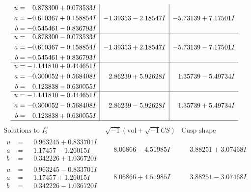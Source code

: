\documentclass[1p]{elsarticle_modified}
\theoremstyle{definition}
\newcommand{\I}{\sqrt{-1}}
\begin{document}
$$\begin{array}{c|c|c}
\begin{aligned}
u &= \phantom{-}0.878300 + 0.073533 I \\
a &= -0.610367 + 0.158854 I \\
b &= -0.545461 - 0.836793 I\end{aligned}
 & -1.39353 - 2.18547 I & -5.73139 + 7.17501 I \\ \hline\begin{aligned}
u &= \phantom{-}0.878300 - 0.073533 I \\
a &= -0.610367 - 0.158854 I \\
b &= -0.545461 + 0.836793 I\end{aligned}
 & -1.39353 + 2.18547 I & -5.73139 - 7.17501 I \\ \hline\begin{aligned}
u &= -1.141810 + 0.444651 I \\
a &= -0.300052 + 0.568408 I \\
b &= \phantom{-}0.123838 - 0.630055 I\end{aligned}
 & \phantom{-}2.86239 + 5.92628 I & \phantom{-}1.35739 - 5.49734 I \\ \hline\begin{aligned}
u &= -1.141810 - 0.444651 I \\
a &= -0.300052 - 0.568408 I \\
b &= \phantom{-}0.123838 + 0.630055 I\end{aligned}
 & \phantom{-}2.86239 - 5.92628 I & \phantom{-}1.35739 + 5.49734 I\\
 \hline 
 \end{array}$$\newpage$$\begin{array}{c|c|c}  
\text{Solutions to }I^u_{2}& \I (\text{vol} + \sqrt{-1}CS) & \text{Cusp shape}\\
 \hline 
\begin{aligned}
u &= \phantom{-}0.963245 + 0.833701 I \\
a &= \phantom{-}1.17457 - 1.26015 I \\
b &= \phantom{-}0.342226 + 1.036720 I\end{aligned}
 & \phantom{-}8.06866 - 4.51985 I & \phantom{-}3.88251 + 3.07468 I \\ \hline\begin{aligned}
u &= \phantom{-}0.963245 - 0.833701 I \\
a &= \phantom{-}1.17457 + 1.26015 I \\
b &= \phantom{-}0.342226 - 1.036720 I\end{aligned}
 & \phantom{-}8.06866 + 4.51985 I & \phantom{-}3.88251 - 3.07468 I \\ \hline\begin{aligned}

\end{aligned}
\end{array}$$
\end{document}
